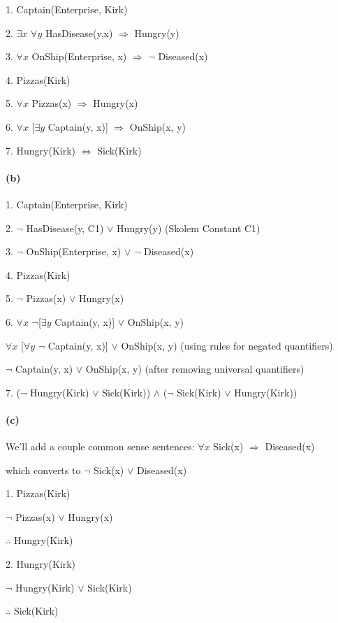 \documentclass[11pt,a4paper]{article}
\begin{document}
1. Captain(Enterprise, Kirk)

2. $\exists x$ $\forall y$ HasDisease(y,x) $\Rightarrow$ Hungry(y)

3. $\forall x$ OnShip(Enterprise, x) $\Rightarrow$ $\neg$ Diseased(x)

4. Pizzas(Kirk)

5. $\forall x$ Pizzas(x) $\Rightarrow$ Hungry(x)

6. $\forall x$ [$\exists y$ Captain(y, x)] $\Rightarrow$ OnShip(x, y)

7. Hungry(Kirk) $\Leftrightarrow$ Sick(Kirk)

\paragraph*{(b)}

1. Captain(Enterprise, Kirk)

2. $\neg$ HasDisease(y, C1) $\vee$ Hungry(y)     (Skolem Constant C1)

3. $\neg$ OnShip(Enterprise, x) $\vee$ $\neg$ Diseased(x)

4. Pizzas(Kirk)

5. $\neg$ Pizzas(x) $\vee$ Hungry(x)

6. $\forall x$ $\neg$[$\exists y$ Captain(y, x)] $\vee$ OnShip(x, y)

$\forall x$ [$\forall y$ $\neg$ Captain(y, x)] $\vee$ OnShip(x, y)  \qquad(using rules for negated quantifiers)

$\neg$ Captain(y, x) $\vee$ OnShip(x, y)        \qquad(after removing universal quantifiers)

7. ($\neg$ Hungry(Kirk) $\vee$ Sick(Kirk)) $\wedge$ ($\neg$ Sick(Kirk) $\vee$ Hungry(Kirk))

\paragraph*{(c)}
We'll add a couple common sense sentences:
$\forall x$ Sick(x) $\Rightarrow$ Diseased(x)

which converts to $\neg$ Sick(x) $\vee$ Diseased(x)

1. Pizzas(Kirk)

$\neg$ Pizzas(x) $\vee$ Hungry(x)

$\therefore$ Hungry(Kirk)
\newline

2. Hungry(Kirk)

$\neg$ Hungry(Kirk) $\vee$ Sick(Kirk)

$\therefore$ Sick(Kirk)
\newline
\end{document}
